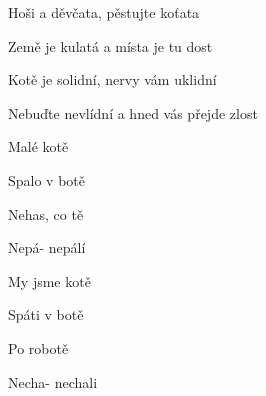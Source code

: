 \begin{song}
\bigskip

Hoši a děvčata, pěstujte koťata \par
{}Země je kulatá a místa je tu dost \par
{}Kotě je solidní, nervy vám uklidní \par
{}Nebuďte nevlídní a hned vás přejde zlost \par

\bigskip

Malé kotě   \par
{}Spalo v botě   \par
{}Nehas, co tě   \par
{}Nepá- nepálí \par

\bigskip

My jsme kotě   \par
{}Spáti v botě   \par
{}Po robotě   \par
{}Necha- nechali \par

\end{song}
